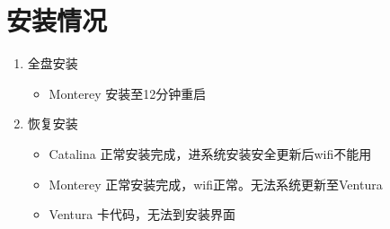\documentclass[lang=cn,12pt,chinesefont=founder]{elegantbook}
\begin{document}
\section{安装情况}
\begin{enumerate}
  \item 全盘安装
  
    \begin{itemize}
        \item Monterey 安装至12分钟重启
    \end{itemize}
  \item 恢复安装
    \begin{itemize}
        \item Catalina 正常安装完成，进系统安装安全更新后wifi不能用
        \item Monterey 正常安装完成，wifi正常。无法系统更新至Ventura
        \item Ventura 卡代码，无法到安装界面
    \end{itemize}
\end{enumerate}
\end{document}
